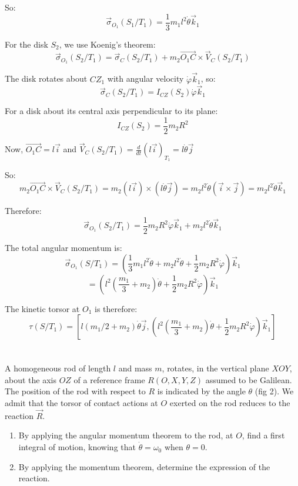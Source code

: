 \documentclass[12pt]{article}
\begin{document}
\begin{correctionbox}
So:
$$\vec{\sigma}_{O_1}(S_1/T_1) = \frac{1}{3}m_1l^2\dot{\theta}\vec{k}_1$$

For the disk $S_2$, we use Koenig's theorem:
$$\vec{\sigma}_{O_1}(S_2/T_1) = \vec{\sigma}_C(S_2/T_1) + m_2\vec{O_1C} \times \vec{V}_C(S_2/T_1)$$

The disk rotates about $CZ_1$ with angular velocity $\dot{\varphi}\vec{k}_1$, so:
$$\vec{\sigma}_C(S_2/T_1) = I_{CZ}(S_2)\dot{\varphi}\vec{k}_1$$

For a disk about its central axis perpendicular to its plane:
$$I_{CZ}(S_2) = \frac{1}{2}m_2R^2$$

Now, $\vec{O_1C} = l\vec{i}$ and $\vec{V}_C(S_2/T_1) = \frac{d}{dt}(l\vec{i})_{T_1} = l\dot{\theta}\vec{j}$

So:
$$m_2\vec{O_1C} \times \vec{V}_C(S_2/T_1) = m_2(l\vec{i}) \times (l\dot{\theta}\vec{j}) = m_2l^2\dot{\theta}(\vec{i} \times \vec{j}) = m_2l^2\dot{\theta}\vec{k}_1$$

Therefore:
$$\vec{\sigma}_{O_1}(S_2/T_1) = \frac{1}{2}m_2R^2\dot{\varphi}\vec{k}_1 + m_2l^2\dot{\theta}\vec{k}_1$$

The total angular momentum is:
$$\vec{\sigma}_{O_1}(S/T_1) = \left(\frac{1}{3}m_1l^2\dot{\theta} + m_2l^2\dot{\theta} + \frac{1}{2}m_2R^2\dot{\varphi}\right)\vec{k}_1$$
$$= \left(l^2\left(\frac{m_1}{3} + m_2\right)\dot{\theta} + \frac{1}{2}m_2R^2\dot{\varphi}\right)\vec{k}_1$$

The kinetic torsor at $O_1$ is therefore:
$$\tau(S/T_1) = \left[l(m_1/2 + m_2)\dot{\theta}\vec{j}, \left(l^2\left(\frac{m_1}{3} + m_2\right)\dot{\theta} + \frac{1}{2}m_2R^2\dot{\varphi}\right)\vec{k}_1\right]$$
\end{correctionbox}

\section{}

A homogeneous rod of length $l$ and mass $m$, rotates, in the vertical plane $XOY$, about the axis $OZ$ of a reference frame $R(O, X, Y, Z)$ assumed to be Galilean. The position of the rod with respect to $R$ is indicated by the angle $\theta$ (fig 2). We admit that the torsor of contact actions at $O$ exerted on the rod reduces to the reaction $\vec{R}$.

\begin{enumerate}
    \item By applying the angular momentum theorem to the rod, at $O$, find a first integral of motion, knowing that $\dot{\theta} = \omega_0$ when $\theta = 0$.
    \item By applying the momentum theorem, determine the expression of the reaction.
\end{enumerate}
\end{document}
